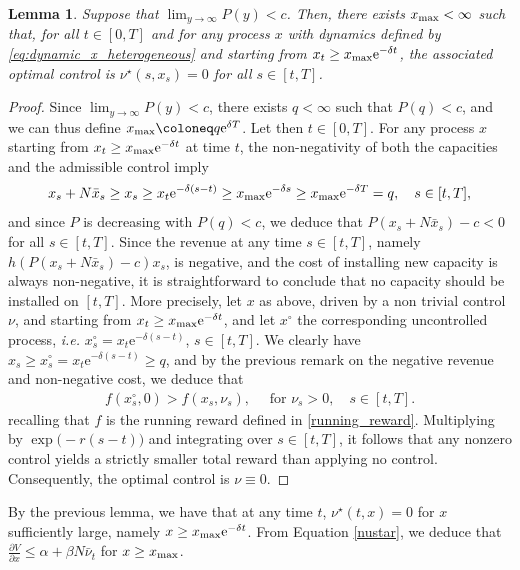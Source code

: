 \documentclass[12pt]{article}
\newtheorem{lemma}{Lemma}[section]
\def\erm{\mathrm{e}}
\begin{document}
\begin{lemma}\label{max}
Suppose that $\lim_{y\rightarrow\infty}P(y)< c$. Then, there exists $x_{\rm max}<\infty$ such that, for all $t \in [0,T]$ and for any process $x$ with dynamics defined by \eqref{eq:dynamic_x_heterogeneous} and starting from $x_t \geq x_{\rm max} \erm^{-\delta t}$, the associated optimal control is $\nu^\star(s,x_s)=0$ for all $s\in[t,T]$.
\end{lemma}
\begin{proof}
Since $\lim_{y\rightarrow\infty}P(y)< c$, there exists $q < \infty$ such that $P(q)<c$, and we can thus define $x_{\rm max} \coloneq q \erm^{\delta T}$. Let then $t \in[0,T]$. For any process $x$ starting from $x_t \geq x_{\rm{max}} \erm^{-\delta t}$ at time $t$, the non-negativity of both the capacities and the admissible control imply
\begin{align*}
    x_s + N\bar{x}_s \geq x_s \geq x_t \erm^{-\delta (s-t)} \geq x_{\rm{max}} \erm^{-\delta s} \geq x_{\rm max} \erm^{- \delta T} = q, \quad s \in [t,T],
\end{align*}
and since $P$ is decreasing with $P(q)<c$, we deduce that $P(x_s + N\bar{x}_s) - c < 0$ for all $s \in [t,T]$. Since the revenue at any time $s \in [t,T]$, namely $h ( P(x_s + N\bar{x}_s) - c ) x_s$, is negative, and the cost of installing new capacity is always non-negative, it is straightforward to conclude that no capacity should be installed on $[t,T]$. More precisely, let $x$ as above, driven by a non trivial control $\nu$, and starting from $x_t \geq x_{\rm max} \erm^{-\delta t}$, and let $x^\circ$ the corresponding uncontrolled process, \textit{i.e.} $x^\circ_s = x_t \erm^{-\delta (s-t)}$, $s \in[t,T]$. We clearly have $x_s \geq x^\circ_s = x_t \erm^{-\delta (s-t)} \geq q$, and by the previous remark on the negative revenue and non-negative cost, we deduce that 
\begin{align*}
    f (x^\circ_s, 0 ) > f (x_s, \nu_s), \quad \text{ for } \nu_s > 0, \quad s \in [t,T].
\end{align*}
recalling that $f$ is the running reward defined in \eqref{running_reward}. Multiplying by \(\exp\bigl(-r(s - t)\bigr)\) and integrating over \(s \in [t,T]\), it follows that any nonzero control yields a strictly smaller total reward than applying no control. Consequently, the optimal control is \(\nu \equiv 0\). 
\end{proof}
By the previous lemma, we have that at any time $t$, $\nu^{\star}{(t,x)}=0$ for $x$ sufficiently large, namely $x \geq x_{\rm max} \erm^{-\delta t}$. From Equation \eqref{nustar}, we deduce that $\frac{\partial V}{\partial x}\leq\alpha+\beta N \bar{\nu}_t$ for $x\geq x_{\rm max}$.
\end{document}
